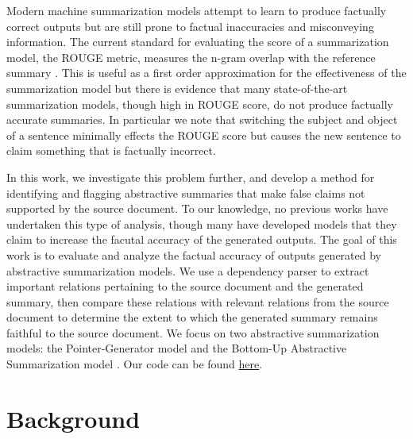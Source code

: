 \documentclass{article}
\begin{document}
Modern machine summarization models attempt to learn to produce factually correct outputs but are still prone to factual inaccuracies and misconveying information. The current standard for evaluating the score of a summarization model, the ROUGE metric, measures the n-gram overlap with the reference summary \cite{lin2004rouge}. This is useful as a first order approximation for the effectiveness of the summarization model but there is evidence that many state-of-the-art summarization models, though high in ROUGE score, do not produce factually accurate summaries. In particular we note that switching the subject and object of a sentence minimally effects the ROUGE score but causes the new sentence to claim something that is factually incorrect.

In this work, we investigate this problem further, and develop a method for identifying and flagging abstractive summaries that make false claims not supported by the source document. To our knowledge, no previous works have undertaken this type of analysis, though many have developed models that they claim to increase the facutal accuracy of the generated outputs. The goal of this work is to evaluate and analyze the factual accuracy of outputs generated by abstractive summarization models. We use a dependency parser to extract important relations pertaining to the source document and the generated summary, then compare these relations with relevant relations from the source document to determine the extent to which the generated summary remains faithful to the source document.
We focus on two abstractive summarization models: the Pointer-Generator model \cite{see2017get} and the Bottom-Up Abstractive Summarization model \cite{gehrmann2018bottom}.
Our code can be found \href{https://github.com/alwayswimmin/cs287-f}{here}.

\section{Background}
\label{sec:background}

\end{document}

